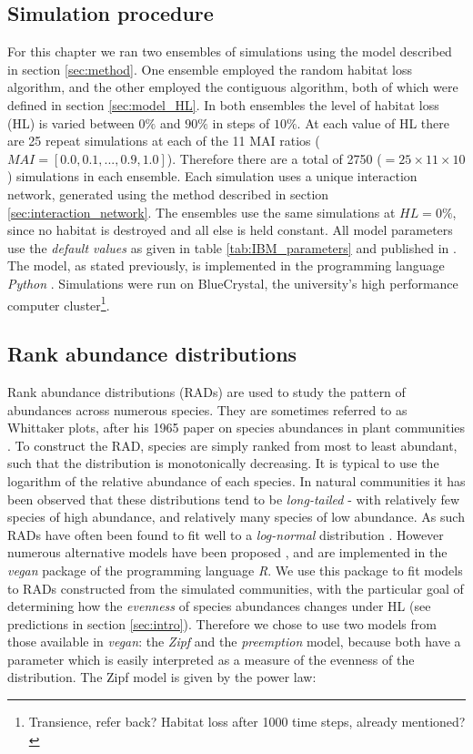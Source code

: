 \subsection{Simulation procedure}
\label{sec:simulation_procedure}

For this chapter we ran two ensembles of simulations using the model described in section \ref{sec:method}. One ensemble employed the random habitat loss algorithm, and the other employed the contiguous algorithm, both of which were defined in section \ref{sec:model_HL}. In both ensembles the level of habitat loss (HL) is varied between $0\%$ and $90\%$ in steps of $10\%$. At each value of HL there are 25 repeat simulations at each of the 11 MAI ratios ($MAI=[0.0,0.1,...,0.9,1.0]$). Therefore there are a total of 2750 ($=25 \times 11 \times 10$) simulations in each ensemble. Each simulation uses a unique interaction network, generated using the method described in section \ref{sec:interaction_network}. The ensembles use the same simulations at $HL=0\%$, since no habitat is destroyed and all else is held constant. All model parameters use the \emph{default values} as given in table \ref{tab:IBM_parameters} and published in \cite{lurgi2015effects}. The model, as stated previously, is implemented in the programming language \emph{Python} \cite{python}. Simulations were run on BlueCrystal, the university's high performance computer cluster\footnote{Transience, refer back? Habitat loss after 1000 time steps, already mentioned?}.   

\subsection{Rank abundance distributions}
\label{sec:define_rads}

Rank abundance distributions (RADs) are used to study the pattern of abundances across numerous species. They are sometimes referred to as Whittaker plots, after his 1965 paper on species abundances in plant communities \cite{whittaker1965dominance}. To construct the RAD, species are simply ranked from most to least abundant, such that the distribution is monotonically decreasing. It is typical to use the logarithm of the relative abundance of each species. In natural communities it has been observed that these distributions tend to be \emph{long-tailed} - with relatively few species of high abundance, and relatively many species of low abundance. As such RADs have often been found to fit well to a \emph{log-normal} distribution \cite{lurgi2015effects,whittaker1965dominance}. However numerous alternative models have been proposed \cite{wilson1991methods}, and are implemented in the \emph{vegan} package \cite{oksanen2007vegan} of the programming language \emph{R}. We use this package to fit models to RADs constructed from the simulated communities, with the particular goal of determining how the \emph{evenness} of species abundances changes under HL (see predictions in section \ref{sec:intro}). Therefore we chose to use two models from those available in \emph{vegan}: the \emph{Zipf} and the \emph{preemption} model, because both have a parameter which is easily interpreted as a measure of the evenness of the distribution. The Zipf model is given by the power law: 

